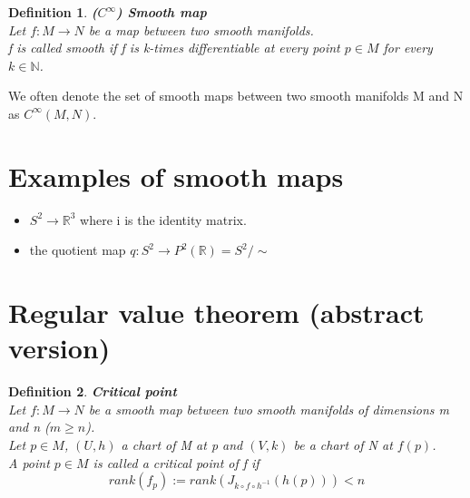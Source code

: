 \documentclass[11pt]{book} %
\newtheorem{definition}{Definition}[section]
\begin{document}
\begin{definition}{\textbf{(\(C^\infty\)) Smooth map}} \\
    Let \( f: M \to N \) be a map between two smooth manifolds. \\
    f is called smooth if f is k-times differentiable at every point \( p \in M \) for every \( k \in \mathbb{N} \).
\end{definition}

We often denote the set of smooth maps between two smooth manifolds M and N as \( C^\infty(M, N) \).


\section{Examples of smooth maps}

\begin{itemize}
    \item \( S^2 \rightarrow \mathbb{R}^3\) where i is the identity matrix.
    \item the quotient map \( q : S^2 \rightarrow P^2(\mathbb{R}) = S^2 / \sim \)
\end{itemize}



\section{Regular value theorem (abstract version)}

\begin{definition}{\textbf{Critical point}} \\
    Let \( f: M \to N \) be a smooth map between two smooth manifolds of dimensions m and n ($m \geq n$). \\
    Let \( p \in M \), \( (U, h) \) a chart of M at p and \((V, k)\) be a chart of N at \(f(p)\). \\
    A point \( p \in M \) is called a critical point of f if 
    \begin{equation*}
        rank(f_p) := rank(J_{k \circ f \circ h^{-1}}(h(p))) < n
    \end{equation*}
\end{definition}
    
\end{document}
